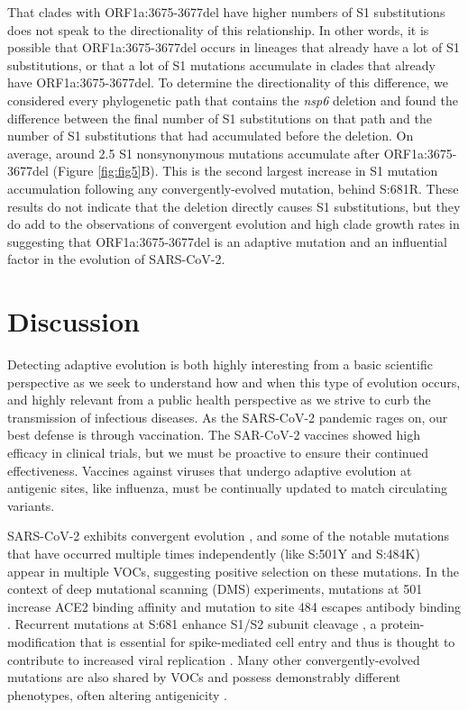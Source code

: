 \documentclass[12pt, letterpaper]{article}
\begin{document}
That clades with ORF1a:3675-3677del have higher numbers of S1 substitutions does not speak to the directionality of this relationship. In other words, it is possible that ORF1a:3675-3677del occurs in lineages that already have a lot of S1 substitutions, or that a lot of S1 mutations accumulate in clades that already have ORF1a:3675-3677del. To determine the directionality of this difference, we considered every phylogenetic path that contains the \emph{nsp6} deletion and found the difference between the final number of S1 substitutions on that path and the number of S1 substitutions that had accumulated before the deletion. On average, around 2.5 S1 nonsynonymous mutations accumulate after ORF1a:3675-3677del (Figure \ref{fig:fig5}B). This is the second largest increase in S1 mutation accumulation following any convergently-evolved mutation, behind S:681R. These results do not indicate that the deletion directly causes S1 substitutions, but they do add to the observations of convergent evolution and high clade growth rates in suggesting that ORF1a:3675-3677del is an adaptive mutation and an influential factor in the evolution of SARS-CoV-2.



\section*{Discussion}
Detecting adaptive evolution is both highly interesting from a basic scientific perspective as we seek to understand how and when this type of evolution occurs, and highly relevant from a public health perspective as we strive to curb the transmission of infectious diseases. As the SARS-CoV-2 pandemic rages on, our best defense is through vaccination. The SAR-CoV-2 vaccines showed high efficacy in clinical trials, but we must be proactive to ensure their continued effectiveness. Vaccines against viruses that undergo adaptive evolution at antigenic sites, like influenza, must be continually updated to match circulating variants.

SARS-CoV-2 exhibits convergent evolution \citep{Van_Dorp2020-ox, Martin2021-lj, Rochman2021-sv}, and some of the notable mutations that have occurred multiple times independently (like S:501Y and S:484K) appear in multiple VOCs, suggesting positive selection on these mutations. In the context of deep mutational scanning (DMS) experiments, mutations at 501 increase ACE2 binding affinity \citep{Starr2020-bt} and mutation to site 484 escapes antibody binding \citep{Greaney2021-jn}. Recurrent mutations at S:681 enhance S1/S2 subunit cleavage \citep{Lubinski2021-ul, Liu2021-ne}, a protein-modification that is essential for spike-mediated cell entry \citep{Hoffmann2020-vi} and thus is thought to contribute to increased viral replication \citep{Liu2021-ne}. Many other convergently-evolved mutations are also shared by VOCs and possess demonstrably different phenotypes, often altering antigenicity \citep{Li2020-jd, McCarthy2021-lg, Wang2021-dm}.
\end{document}

